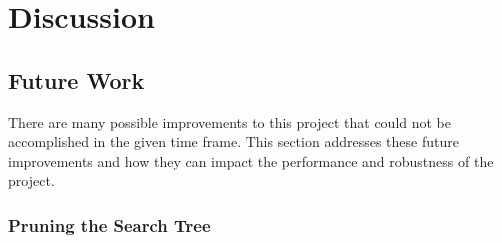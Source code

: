 


\chapter{Discussion}

\label{chapter:discussion}

% 

\section{Future Work}

There are many possible improvements to this project that could not be
accomplished in the given time frame. This section addresses these future
improvements and how they can impact the performance and robustness of the
project.

\subsection{Pruning the Search Tree}


